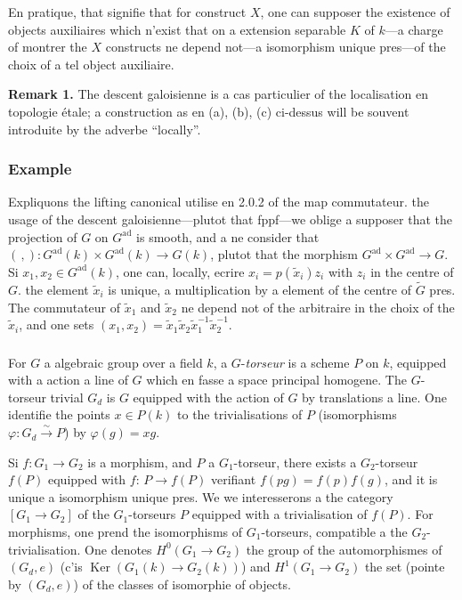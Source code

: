 \documentclass[12pt,a4paper]{article}
\theoremstyle{plain}
\theoremstyle{definition}
\theoremstyle{remark}
\DeclareMathOperator{\Ker}{Ker}
\newcommand{\simto}{\xrightarrow{\sim}}
\begin{document}
En pratique, that signifie that for construct $X$, one can supposer the existence of objects auxiliaires which n'exist that on a extension separable $K$ of $k$---a charge of montrer the $X$ constructs ne depend not---a isomorphism unique pres---of the choix of a tel object auxiliaire.

\textbf{Remark 1.} The descent galoisienne is a cas particulier of the localisation en topologie étale; a construction as en (a), (b), (c) ci-dessus will be souvent introduite by the adverbe ``locally''.

\subsubsection{Example}

Expliquons the lifting canonical utilise en 2.0.2 of the map commutateur. the usage of the descent galoisienne---plutot that fppf---we oblige a supposer that the projection of $G$ on $G^{\text{ad}}$ is smooth, and a ne consider that $(\,,): G^{\text{ad}}(k) \times G^{\text{ad}}(k) \to G(k)$, plutot that the morphism $G^{\text{ad}} \times G^{\text{ad}} \to G$. Si $x_1, x_2 \in G^{\text{ad}}(k)$, one can, locally, ecrire $x_i = p(\tilde{x}_i)z_i$ with $z_i$ in the centre of $G$. the element $\tilde{x}_i$ is unique, a multiplication by a element of the centre of $\tilde{G}$ pres. The commutateur of $\tilde{x}_1$ and $\tilde{x}_2$ ne depend not of the arbitraire in the choix of the $\tilde{x}_i$, and one sets $(x_1,x_2) = \tilde{x}_1\tilde{x}_2\tilde{x}_1^{-1}\tilde{x}_2^{-1}$.

\subsubsection{}

For $G$ a algebraic group over a field $k$, a $G$-\textit{torseur} is a scheme $P$ on $k$, equipped with a action a line of $G$ which en fasse a space principal homogene. The $G$-torseur trivial $G_d$ is $G$ equipped with the action of $G$ by translations a line. One identifie the points $x \in P(k)$ to the trivialisations of $P$ (isomorphisms $\varphi: G_d \simto P$) by $\varphi(g) = xg$.

Si $f:G_1 \to G_2$ is a morphism, and $P$ a $G_1$-torseur, there exists a $G_2$-torseur $f(P)$ equipped with $f$: $P \to f(P)$ verifiant $f(pg) = f(p)f(g)$, and it is unique a isomorphism unique pres. We we interesserons a the category $[G_1 \to G_2]$ of the $G_1$-torseurs $P$ equipped with a trivialisation of $f(P)$. For morphisms, one prend the isomorphisms of $G_1$-torseurs, compatible a the $G_2$-trivialisation. One denotes $H^0(G_1 \to G_2)$ the group of the automorphismes of $(G_d,e)$ (c'is $\Ker(G_1(k) \to G_2(k))$) and $H^1(G_1 \to G_2)$ the set (pointe by $(G_d,e)$) of the classes of isomorphie of objects.
\end{document}
